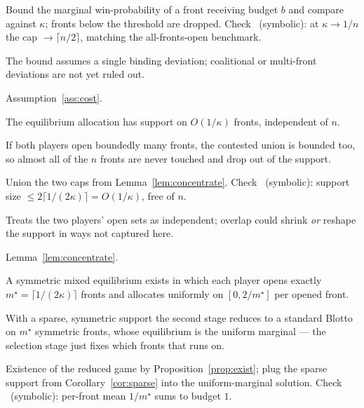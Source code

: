\documentclass[10pt,a4paper]{article}
\begin{document}
{\footnotesize\Proofsketch Bound the marginal win-probability of a front
receiving budget $b$ and compare against $\kappa$; fronts below the threshold are
dropped. Check \checkmark\ (symbolic): at $\kappa\to 1/n$ the cap $\to\lceil
n/2\rceil$, matching the all-fronts-open benchmark.\par}

{\footnotesize\Risk The bound assumes a single binding deviation; coalitional or
multi-front deviations are not yet ruled out.\par}

\Uses Assumption~\ref{ass:cost}.

\begin{corollary}[h]\label{cor:sparse}
The equilibrium allocation has support on $O(1/\kappa)$ fronts, independent of
$n$.
\end{corollary}

\Intuition If both players open boundedly many fronts, the contested union is
bounded too, so almost all of the $n$ fronts are never touched and drop out of
the support.

{\footnotesize\Proofsketch Union the two caps from
Lemma~\ref{lem:concentrate}. Check \checkmark\ (symbolic): support size
$\le 2\lceil 1/(2\kappa)\rceil = O(1/\kappa)$, free of $n$.\par}

{\footnotesize\Risk Treats the two players' open sets as independent; overlap
could shrink \emph{or} reshape the support in ways not captured here.\par}

\Uses Lemma~\ref{lem:concentrate}.

\begin{theorem}[c]\label{thm:char}
A symmetric mixed equilibrium exists in which each player opens exactly
$m^\star=\lceil 1/(2\kappa)\rceil$ fronts and allocates uniformly on
$[0,2/m^\star]$ per opened front.
\end{theorem}

\Intuition With a sparse, symmetric support the second stage reduces to a
standard Blotto on $m^\star$ symmetric fronts, whose equilibrium is the uniform
marginal --- the selection stage just fixes which fronts that runs on.

{\footnotesize\Proofsketch Existence of the reduced game by
Proposition~\ref{prop:exist}; plug the sparse support from
Corollary~\ref{cor:sparse} into the uniform-marginal solution. Check \checkmark\
(symbolic): per-front mean $1/m^\star$ sums to budget $1$.\par}
\end{document}
